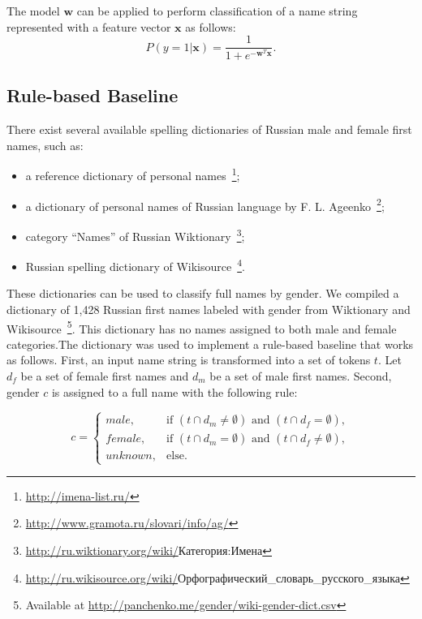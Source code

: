 \documentclass[runningheads,a4paper]{llncs}
\newcommand\textcyr[1]{{\fontencoding{OT2}\fontfamily{wncyr}\selectfont #1}}
\newenvironment{itemize2}
       {\begin{itemize}
                \vspace{-0.25em}
                 \setlength{\abovedisplayskip}{0pt}
                 \setlength{\belowdisplayskip}{0pt}
                 \setlength{\itemsep}{4pt}
                 \setlength{\parskip}{0pt}
                 \setlength{\parsep}{0pt}
                 \setlength{\topsep}{0pt}
                 \setlength{\partopsep}{0pt}
         }
         {\vspace{-0.25em}
         \end{itemize}}
\begin{document}
The model $\mathbf{w}$ can be applied to perform classification of a name string represented with a feature vector $\mathbf{x}$ as follows:
$$
P(y=1|\mathbf{x}) = \frac{1}{1 + e^{-\mathbf{w}^T \mathbf{x}}  }.
$$


\subsection{Rule-based Baseline}

There exist several available spelling dictionaries of Russian male and female first names, such as: 

\begin{itemize2}

\item a reference dictionary of personal names~\footnote{\url{http://imena-list.ru/}};

\item a dictionary of personal names of Russian language by F. L. Ageenko~\footnote{\url{http://www.gramota.ru/slovari/info/ag/}};

\item category ``Names'' of Russian Wiktionary~\footnote{\url{http://ru.wiktionary.org/wiki/}\textcyr{Категория:Имена}};

\item Russian spelling dictionary of Wikisource~\footnote{\url{http://ru.wikisource.org/wiki/}\textcyr{Орфографический\_словарь\_русского\_языка}}.

\end{itemize2}

These dictionaries can be used to classify full names by gender. We compiled a dictionary of 1,428 Russian first names labeled with gender from Wiktionary and Wikisource~\footnote{Available at \url{http://panchenko.me/gender/wiki-gender-dict.csv}}. This dictionary has no names assigned to both male and female categories.The dictionary was used to implement a rule-based baseline that works as follows. First, an   input name string is transformed into a set of tokens $t$. Let $d_f$ be a set of female first names and $d_m$ be a set of male first names. Second, gender $c$ is assigned to a full name with the following rule:

$$
c = \begin{cases}
    male, & \mbox{if } (t \cap d_m \neq \emptyset) \mbox{ and } (t \cap d_f = \emptyset), \\
    female, & \mbox{if } (t \cap d_m = \emptyset) \mbox{ and } (t \cap d_f \neq \emptyset), \\
    unknown, & \mbox{else}.
    \end{cases}
$$
\end{document}
